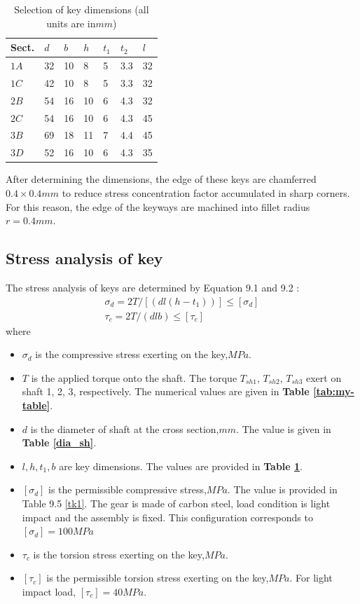 \begin{table}[ht]
	\centering
	\caption{Selection of key dimensions (all units are in$ \unit{mm} $)}
	\begin{tabular}{lllllll}\toprule
		Sect. & $ d $ & $ b $ & $ h $ & $ t_1 $ & $ t_2 $ & $ l $\\\midrule
		$ 1A $ & 32 & 10 & 8 & 5 & 3.3 & 32\\
		$ 1C $ & 42 & 10 & 8 & 5 & 3.3 & 32\\
		$ 2B $ & 54 & 16 & 10 & 6 & 4.3 & 32\\
		$ 2C $ & 54 & 16 & 10 & 6 & 4.3 & 45\\
		$ 3B $ & 69 & 18 & 11 & 7 & 4.4 & 45\\
		$ 3D $ & 52 & 16 & 10 & 6 & 4.3 & 35\\\bottomrule
	\end{tabular}
	\label{keydimtab}
\end{table}

After determining the dimensions, the edge of these keys are chamferred $ 0.4\times 0.4 \unit{mm} $ to reduce stress concentration factor accumulated in sharp corners. For this reason, the edge of the keyways are machined into fillet radius $ r = 0.4 \unit{mm} $.

\subsection{Stress analysis of key}
The stress analysis of keys are determined by Equation 9.1 and 9.2 \cite{tk1}:
\[
\begin{array}{l}
\sigma_d = 2T/[(dl(h-t_1))] \leq [\sigma_d]\\
\tau_c = 2T/(dlb) \leq [\tau_c]
\end{array}
\]
where
\begin{itemize}
	\item $ \sigma_d $ is the compressive stress exerting on the key,$ \unit{MPa} $.
	\item $ T $ is the applied torque onto the shaft. The torque $ T_{sh1} $, $ T_{sh2} $, $ T_{sh3} $ exert on shaft 1, 2, 3, respectively. The numerical values are given in \textbf{Table \ref{tab:my-table}}.
	\item $ d $ is the diameter of shaft at the cross section,$ \unit{mm} $. The value is given in \textbf{Table \ref{dia_sh}}.
	\item $ l, h, t_1, b $ are key dimensions. The values are provided in \textbf{Table \ref{keydimtab}}.
	\item $ [\sigma_d] $ is the permissible compressive stress,$ \unit{MPa} $. The value is provided in Table 9.5 \ref{tk1}. The gear is made of carbon steel, load condition is light impact and the assembly is fixed. This configuration corresponds to $ [\sigma_d] = 100 \unit{MPa} $
	\item $ \tau_c $ is the torsion stress exerting on the key,$ \unit{MPa} $.
	\item $ [\tau_c] $ is the permissible torsion stress exerting on the key,$ \unit{MPa} $. For light impact load, $ [\tau_c] = 40 \unit{MPa} $.
\end{itemize}

